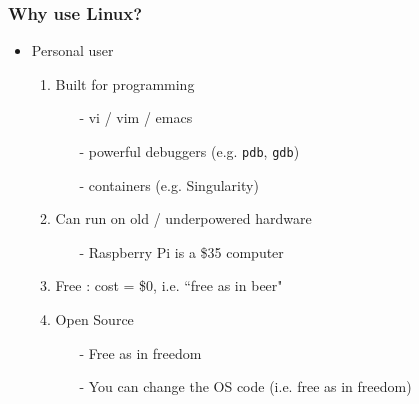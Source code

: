 \documentclass{beamer}
\newcommand{\code}[1]{\colorbox{codegray}{\texttt{#1}}}
\begin{document}
\begin{frame}
\frametitle{Why use Linux?}
\begin{itemize}
    \item Personal user
    \pause
    \begin{enumerate}
        \item Built for programming
        \begin{itemize}
            \pause
            \item[-] vi / vim / emacs
            \pause
            \item[-] powerful debuggers (e.g. \code{pdb}, \code{gdb})
            \pause
            \item[-] containers (e.g. Singularity)
        \end{itemize}
        \pause
        \item Can run on old / underpowered hardware
        \begin{itemize}
            \item[-] Raspberry Pi is a \$35 computer
        \end{itemize}
        \pause
        \item Free : cost = \$0, i.e. ``free as in beer"
        \pause
        \item Open Source 
        \begin{itemize}
            \item[-] Free as in freedom 
            \pause
            \item[-] You can change the OS code (i.e. free as in freedom)
        \end{itemize}
    \end{enumerate}
\end{itemize}
\end{frame}
\end{document}
